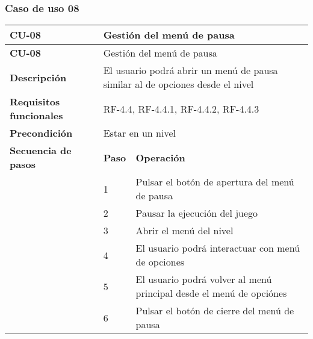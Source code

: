 \subsubsection{Caso de uso 08}
\begin{longtable}{lll}
\textbf{CU-08}                                   & \multicolumn{2}{l}{Gestión del menú de pausa}                                                              \\ \hline
\endfirsthead
\textbf{CU-08}                                   & \multicolumn{2}{l}{Gestión del menú de pausa}                                                              \\ \hline
\endhead
%
\textbf{Descripción}                             & \multicolumn{2}{l}{El usuario podrá abrir un menú de pausa similar al de opciones desde el nivel}          \\ \hline
\textbf{Requisitos funcionales}                  & \multicolumn{2}{l}{RF-4.4, RF-4.4.1, RF-4.4.2, RF-4.4.3}                                                   \\ \hline
\textbf{Precondición}                            & \multicolumn{2}{l}{Estar en un nivel}                                                                      \\ \hline
\multicolumn{1}{l|}{\textbf{Secuencia de pasos}} & \textbf{Paso}             & \textbf{Operación}                                                             \\ \cline{2-3} 
\multicolumn{1}{l|}{}                            & 1                         & Pulsar el botón de apertura del menú de pausa                                  \\
\multicolumn{1}{l|}{}                            & 2                         & Pausar la ejecución del juego                                                  \\
\multicolumn{1}{l|}{}                            & 3                         & Abrir el menú del nivel                                                        \\
\multicolumn{1}{l|}{}                            & 4                         & El usuario podrá interactuar con menú de opciones                              \\
\multicolumn{1}{l|}{}                            & 5                         & El usuario podrá volver al menú principal desde el menú de opciónes            \\
\multicolumn{1}{l|}{}                            & 6                         & Pulsar el botón de cierre del menú de pausa                                    \\

\end{longtable}
